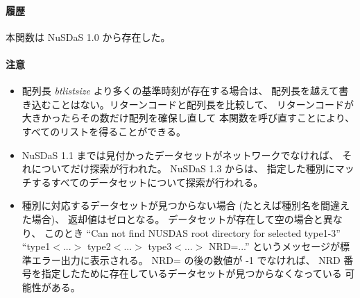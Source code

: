 \paragraph{履歴}
本関数は NuSDaS 1.0 から存在した。
\paragraph{注意}
\begin{itemize}
\item 
配列長 {\it btlistsize} より多くの基準時刻が存在する場合は、
配列長を越えて書き込むことはない。リターンコードと配列長を比較して、
リターンコードが大きかったらその数だけ配列を確保し直して
本関数を呼び直すことにより、すべてのリストを得ることができる。
\item 
NuSDaS 1.1 までは見付かったデータセットがネットワークでなければ、
それについてだけ探索が行われた。
NuSDaS 1.3 からは、
指定した種別にマッチするすべてのデータセットについて探索が行われる。
\item 
種別に対応するデータセットが見つからない場合
(たとえば種別名を間違えた場合)、
返却値はゼロとなる。
データセットが存在して空の場合と異なり、
このとき ``Can not find NUSDAS root directory for selected type1-3''
``type1$<$...$>$ type2$<$...$>$ type3$<$...$>$ NRD=...''
というメッセージが標準エラー出力に表示される。
NRD= の後の数値が -1 でなければ、
NRD 番号を指定したために存在しているデータセットが見つからなくなっている
可能性がある。
\end{itemize}
